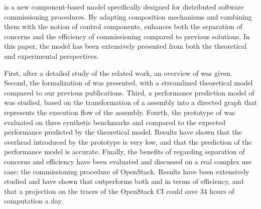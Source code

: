 \mad is a new component-based model specifically designed for
distributed software commissioning procedures. By adapting composition
mechanisms and combining them with the notion of control components,
\mad enhances both the separation of concerns and the efficiency of
commissioning compared to previous solutions. In this paper, the \mad
model has been extensively presented from both the theoretical and
experimental perspectives.

First, after a detailed study of the related work, an overview of \mad
was given. Second, the formalization of \mad was presented, with a
streamlined theoretical model compared to our previous
publications. Third, a performance prediction model of \mad was
studied, based on the transformation of a \mad assembly into a
directed graph that represents the execution flow of the
assembly. Fourth, the prototype of \mad was evaluated on three
synthetic benchmarks and compared to the expected performance
predicted by the theoretical model. Results have shown that the
overhead introduced by the prototype is very low, and that the
prediction of the performance model is accurate. Finally, the benefits
of \mad regarding separation of concerns and efficiency have been
evaluated and discussed on a real complex use case: the commissioning
procedure of OpenStack. Results have been extensively studied and have
shown that
\mad outperforms both \ansible and \aeolus in terms of efficiency, and that a 
projection on the traces of the OpenStack CI could save 34 hours of computation a 
day.




